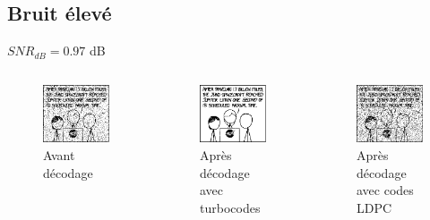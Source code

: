 \documentclass[11pt]{beamer}
\begin{document}
\subsection{Bruit \'elev\'e}


\begin{frame}{$SNR_{dB} = 0.97$ dB}
	\begin{columns}
		\begin{column}{.3\textwidth}
			\begin{figure}
				\includegraphics[scale=0.4]{turbo_noisy_80}\\
				Avant d\'ecodage
			\end{figure}
		\end{column}
		\begin{column}{.3\textwidth}
			\begin{figure}
				\includegraphics[scale=0.4]{turbo_decoded_80}\\
				Apr\`es d\'ecodage avec turbocodes
			\end{figure}
		\end{column}
		\begin{column}{.3\textwidth}
			\begin{figure}
				\includegraphics[scale=0.4]{ldpc_basic_decoded_80}\\
				Apr\`es d\'ecodage avec codes LDPC
			\end{figure}
		\end{column}
	\end{columns}
\end{frame}
\end{document}
